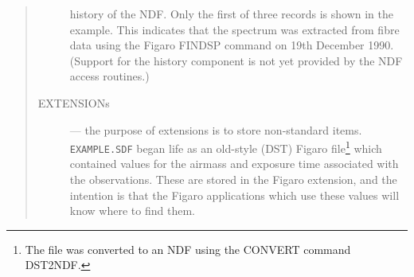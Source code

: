 \begin{quote}
\begin{description}
 history of the NDF.
 Only the first of three records is shown in the example.
 This indicates that the spectrum was extracted from fibre data using the
 Figaro FINDSP command on 19th December 1990.
 (Support for the history component is not yet provided by the NDF access
 routines.)
\item[{EXTENSIONs}] --- the purpose of extensions is to store non-standard
 items.
 \verb+EXAMPLE.SDF+ began life as an old-style (DST) Figaro file\footnote{The
 file was converted to an NDF using the CONVERT command DST2NDF.} which
 contained values for the airmass and exposure time associated with the
 observations.
 These are stored in the Figaro extension, and the intention is that the
 Figaro applications which use these values will know where to find them.
\end{description}
\end{quote}
